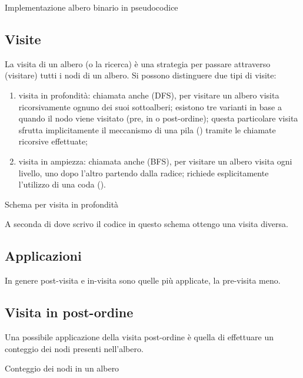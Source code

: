 \begin{algorithm}[H]
	\caption{Implementazione albero binario in pseudocodice}
	
\end{algorithm}

\subsection{Visite}

La visita di un albero (o la ricerca) è una strategia per passare attraverso (visitare) tutti i nodi di un albero.
Si possono distinguere due tipi di visite:
\begin{enumerate}
	\item visita in profondità: chiamata anche  (DFS), per visitare un albero visita ricorsivamente ognuno dei suoi sottoalberi; esistono tre varianti in base a quando il nodo viene visitato (pre, in o post-ordine); questa particolare visita sfrutta implicitamente il meccanismo di una pila () tramite le chiamate ricorsive effettuate;
	\item visita in ampiezza: chiamata anche  (BFS), per visitare un albero visita ogni livello, uno dopo l'altro partendo dalla radice; richiede esplicitamente l'utilizzo di una coda ().
\end{enumerate}

\begin{algorithm}[H]
	\caption{Schema per visita in profondità}
	
\end{algorithm}

A seconda di dove scrivo il codice in questo schema ottengo una visita diversa.

\clearpage
\subsection{Applicazioni}

In genere post-visita e in-visita sono quelle più applicate, la pre-visita meno.

\subsection*{Visita in post-ordine}

Una possibile applicazione della visita post-ordine è quella di effettuare un conteggio dei nodi presenti nell'albero.

\begin{algorithm}[H]
	\caption{Conteggio dei nodi in un albero}
	
\end{algorithm}

